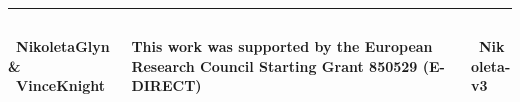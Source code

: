 \documentclass[usenames,dvipsnames,t]{beamer}
\begin{document}
\begin{columns}
\begin{column}{.33\linewidth}
    \vspace{1cm}
\end{column}
\end{columns}

\vspace{.5cm}

\hrule height 3pt
\begin{columns}
    \begin{column}{.2\linewidth}
        \vspace{0.3cm}

        \centering
        \textbf{ \faTwitter \ NikoletaGlyn \& \faTwitter \ VinceKnight}
    \end{column}
    \begin{column}{.6\linewidth}
        \vspace{0.3cm}

        \centering
        \textbf{ This work was supported by the European Research Council Starting Grant 850529 (E-DIRECT)}
    \end{column}
    \begin{column}{.2\linewidth}
        \vspace{0.3cm}

        \centering
        \textbf{ \faGithub \ Nikoleta-v3}
    \end{column}
\end{columns}
\end{document}
